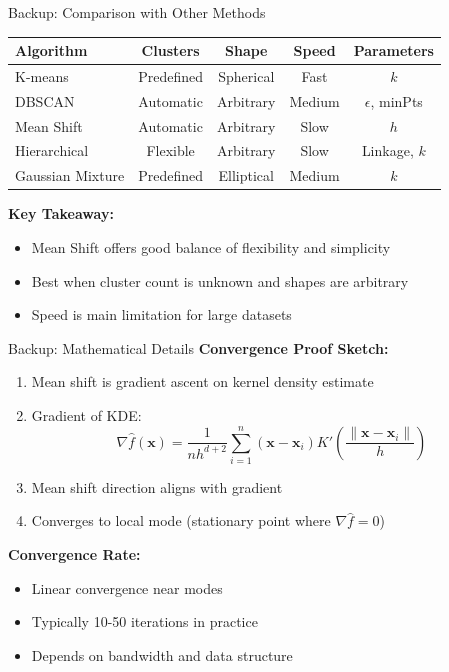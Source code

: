 \begin{frame}{Backup: Comparison with Other Methods}
    \begin{table}
        \centering
        \small
        \begin{tabular}{lcccc}
            \toprule
            \textbf{Algorithm} & \textbf{Clusters} & \textbf{Shape} & \textbf{Speed} & \textbf{Parameters} \\
            \midrule
            K-means & Predefined & Spherical & Fast & $k$ \\
            DBSCAN & Automatic & Arbitrary & Medium & $\epsilon$, minPts \\
            Mean Shift & Automatic & Arbitrary & Slow & $h$ \\
            Hierarchical & Flexible & Arbitrary & Slow & Linkage, $k$ \\
            Gaussian Mixture & Predefined & Elliptical & Medium & $k$ \\
            \bottomrule
        \end{tabular}
    \end{table}

    \vspace{0.5cm}

    \textbf{Key Takeaway:}
    \begin{itemize}
        \item Mean Shift offers good balance of flexibility and simplicity
        \item Best when cluster count is unknown and shapes are arbitrary
        \item Speed is main limitation for large datasets
    \end{itemize}
\end{frame}

\begin{frame}{Backup: Mathematical Details}
    \textbf{Convergence Proof Sketch:}

    \begin{enumerate}
        \item Mean shift is gradient ascent on kernel density estimate
        \item Gradient of KDE:
        \[
        \nabla \hat{f}(\mathbf{x}) = \frac{1}{nh^{d+2}} \sum_{i=1}^{n} (\mathbf{x} - \mathbf{x}_i) K'\left(\frac{\|\mathbf{x} - \mathbf{x}_i\|}{h}\right)
        \]

        \item Mean shift direction aligns with gradient
        \item Converges to local mode (stationary point where $\nabla \hat{f} = 0$)
    \end{enumerate}

    \vspace{0.5cm}

    \textbf{Convergence Rate:}
    \begin{itemize}
        \item Linear convergence near modes
        \item Typically 10-50 iterations in practice
        \item Depends on bandwidth and data structure
    \end{itemize}
\end{frame}
